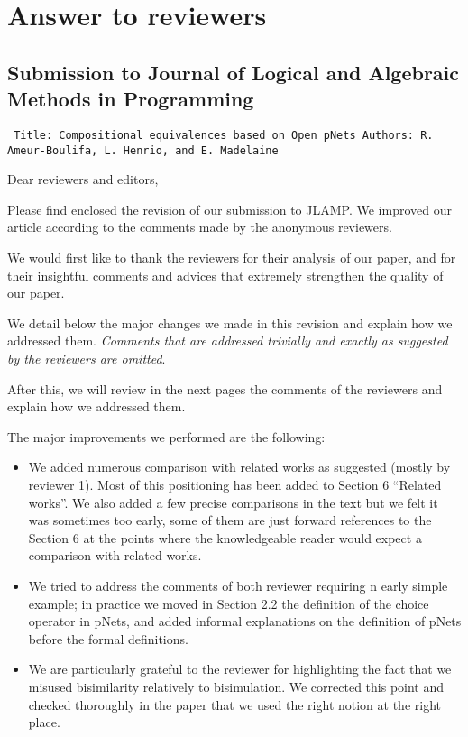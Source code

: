 \documentclass[10pt]{article}
\newenvironment{ttbox}{\begin{alltt}\small\tt}%
                      {\end{alltt}}
\begin{document}
\section*{Answer to reviewers }
\subsection*{Submission to Journal of Logical and Algebraic Methods in Programming}
\medskip
\begin{ttbox}
Title: Compositional equivalences based on Open pNets
Authors: R. Ameur-Boulifa, L. Henrio, and E. Madelaine
\end{ttbox}
\bigskip
Dear reviewers and editors,

Please find enclosed the revision of our submission to JLAMP. We improved our article according to the comments made by the
anonymous reviewers.

We would first like to thank the reviewers for their analysis of our
paper, and for their insightful comments and advices that extremely strengthen the quality of our paper.

We detail below the major changes we made in this revision and explain how we addressed them.  \emph{Comments that are  addressed trivially and exactly as suggested by the reviewers are omitted}.  

After this, we will review in the next pages the comments of the reviewers and explain how we addressed them. 

The major improvements we performed are the following:
\begin{itemize}
\item We added numerous comparison with related works as suggested (mostly by reviewer 1). 
Most of this positioning has been added to Section 6 ``Related works''. 
We also added a few precise comparisons in the text but we felt it was sometimes too  early, some of them are just forward references to the Section 6 at the points where the knowledgeable reader would expect a comparison with related works.
\item We tried to address the comments of both reviewer requiring n early simple example; in practice we moved in Section  2.2 the definition of the choice operator in pNets, and added informal explanations on the definition of pNets before the formal definitions.
\item We are particularly grateful to the reviewer for highlighting the fact that we misused bisimilarity relatively to bisimulation. We corrected this point and checked thoroughly in the paper that we used the right notion at the right place.
\end{itemize}
\end{document}
